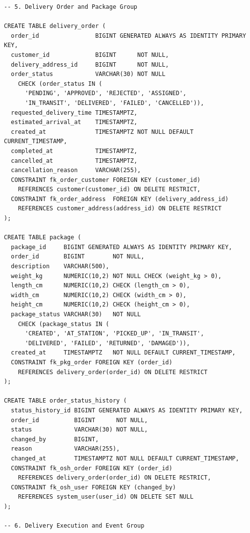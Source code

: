 \begin{verbatim}
-- 5. Delivery Order and Package Group

CREATE TABLE delivery_order (
  order_id                BIGINT GENERATED ALWAYS AS IDENTITY PRIMARY KEY,
  customer_id             BIGINT      NOT NULL,
  delivery_address_id     BIGINT      NOT NULL,
  order_status            VARCHAR(30) NOT NULL
    CHECK (order_status IN (
      'PENDING', 'APPROVED', 'REJECTED', 'ASSIGNED',
      'IN_TRANSIT', 'DELIVERED', 'FAILED', 'CANCELLED')),
  requested_delivery_time TIMESTAMPTZ,
  estimated_arrival_at    TIMESTAMPTZ,
  created_at              TIMESTAMPTZ NOT NULL DEFAULT CURRENT_TIMESTAMP,
  completed_at            TIMESTAMPTZ,
  cancelled_at            TIMESTAMPTZ,
  cancellation_reason     VARCHAR(255),
  CONSTRAINT fk_order_customer FOREIGN KEY (customer_id)
    REFERENCES customer(customer_id) ON DELETE RESTRICT,
  CONSTRAINT fk_order_address  FOREIGN KEY (delivery_address_id)
    REFERENCES customer_address(address_id) ON DELETE RESTRICT
);

CREATE TABLE package (
  package_id     BIGINT GENERATED ALWAYS AS IDENTITY PRIMARY KEY,
  order_id       BIGINT        NOT NULL,
  description    VARCHAR(500),
  weight_kg      NUMERIC(10,2) NOT NULL CHECK (weight_kg > 0),
  length_cm      NUMERIC(10,2) CHECK (length_cm > 0),
  width_cm       NUMERIC(10,2) CHECK (width_cm > 0),
  height_cm      NUMERIC(10,2) CHECK (height_cm > 0),
  package_status VARCHAR(30)   NOT NULL
    CHECK (package_status IN (
      'CREATED', 'AT_STATION', 'PICKED_UP', 'IN_TRANSIT',
      'DELIVERED', 'FAILED', 'RETURNED', 'DAMAGED')),
  created_at     TIMESTAMPTZ   NOT NULL DEFAULT CURRENT_TIMESTAMP,
  CONSTRAINT fk_pkg_order FOREIGN KEY (order_id)
    REFERENCES delivery_order(order_id) ON DELETE RESTRICT
);

CREATE TABLE order_status_history (
  status_history_id BIGINT GENERATED ALWAYS AS IDENTITY PRIMARY KEY,
  order_id          BIGINT      NOT NULL,
  status            VARCHAR(30) NOT NULL,
  changed_by        BIGINT,
  reason            VARCHAR(255),
  changed_at        TIMESTAMPTZ NOT NULL DEFAULT CURRENT_TIMESTAMP,
  CONSTRAINT fk_osh_order FOREIGN KEY (order_id)
    REFERENCES delivery_order(order_id) ON DELETE RESTRICT,
  CONSTRAINT fk_osh_user FOREIGN KEY (changed_by)
    REFERENCES system_user(user_id) ON DELETE SET NULL
);

-- 6. Delivery Execution and Event Group


\end{verbatim}
